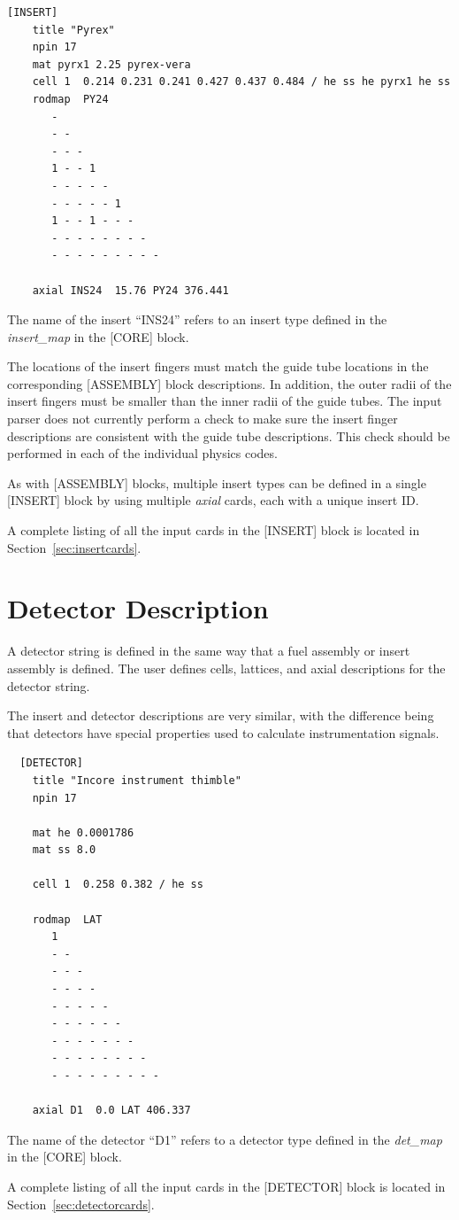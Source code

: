 \begin{verbatim}
[INSERT]
    title "Pyrex"
    npin 17
    mat pyrx1 2.25 pyrex-vera
    cell 1  0.214 0.231 0.241 0.427 0.437 0.484 / he ss he pyrx1 he ss
    rodmap  PY24
       -
       - -
       - - -
       1 - - 1
       - - - - -
       - - - - - 1
       1 - - 1 - - -
       - - - - - - - -
       - - - - - - - - -

    axial INS24  15.76 PY24 376.441
\end{verbatim}

The name of the insert ``INS24'' refers to an insert type defined in the
{\it insert\_map} in the [CORE] block.

The locations of the insert fingers must match the guide tube locations in the
corresponding [ASSEMBLY] block descriptions.  In addition, the outer radii of the insert
fingers must be smaller than the inner radii of the guide tubes.
The input parser does not currently perform a check to make sure the insert finger
descriptions are consistent with the guide tube descriptions.
This check should be performed in each of the individual physics codes.

As with [ASSEMBLY] blocks, multiple insert types can be defined in a single [INSERT]
block by using multiple {\it axial} cards, each with a unique insert ID.

A complete listing of all the input cards in the [INSERT] block is located in Section~\ref{sec:insertcards}.

\section{Detector Description}
A detector string is defined in the same way that a fuel assembly or insert assembly is defined.
The user defines cells, lattices, and axial descriptions for the detector string.

The insert and detector descriptions are very similar, with the difference being that
detectors have special properties used to calculate instrumentation signals.

\begin{verbatim}
  [DETECTOR]
    title "Incore instrument thimble"
    npin 17

    mat he 0.0001786
    mat ss 8.0

    cell 1  0.258 0.382 / he ss

    rodmap  LAT
       1
       - -
       - - -
       - - - -
       - - - - -
       - - - - - -
       - - - - - - -
       - - - - - - - -
       - - - - - - - - -

    axial D1  0.0 LAT 406.337
\end{verbatim}

The name of the detector ``D1'' refers to a detector type defined in the
{\it det\_map} in the [CORE] block.

A complete listing of all the input cards in the [DETECTOR] block is located in Section~\ref{sec:detectorcards}.



